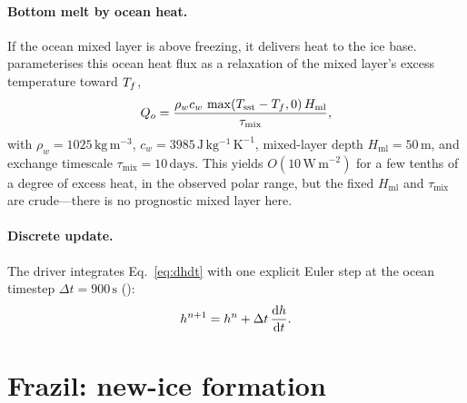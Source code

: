 \paragraph{Bottom melt by ocean heat.} If the ocean mixed layer is above
freezing, it delivers heat to the ice base. \model{} parameterises this ocean
heat flux as a relaxation of the mixed layer's excess temperature toward
$T_{f}$,
\begin{equation}
  Q_{o} = \frac{\rho_w c_w\,\max(T_{\mathrm{sst}}-T_{f},0)\,H_{\mathrm{ml}}}
               {\tau_{\mathrm{mix}}},
  \label{eq:ohf}
\end{equation}
with $\rho_w=1025\,\mathrm{kg\,m^{-3}}$, $c_w=3985\,\mathrm{J\,kg^{-1}\,K^{-1}}$,
mixed-layer depth $H_{\mathrm{ml}}=50\,\mathrm{m}$, and exchange timescale
$\tau_{\mathrm{mix}}=10\,\mathrm{days}$. This yields $O(10\,
\mathrm{W\,m^{-2}})$ for a few tenths of a degree of excess heat, in the observed
polar range, but the fixed $H_{\mathrm{ml}}$ and $\tau_{\mathrm{mix}}$ are
crude---there is no prognostic mixed layer here.

\paragraph{Discrete update.} The driver integrates Eq.~\eqref{eq:dhdt} with one
explicit Euler step at the ocean timestep $\Delta t = 900\,\mathrm{s}$
():
\begin{equation}
  h^{n+1} = h^{n} + \Delta t\,\frac{\mathrm{d}h}{\mathrm{d}t}.
\end{equation}

\section{Frazil: new-ice formation}

